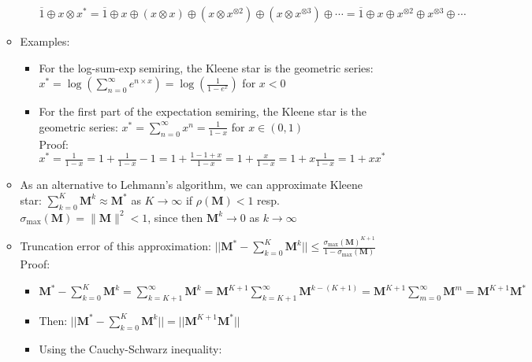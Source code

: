 \begin{itemize}
\begin{itemize}
\begin{itemize}
            $
            \overline{1} \oplus x \otimes x^* = \overline{1} \oplus x \oplus (x \otimes x) \oplus (x \otimes x^{\otimes 2}) \oplus (x \otimes x^{\otimes 3}) \oplus \cdots = \overline{1} \oplus x \oplus x^{\otimes 2} \oplus x^{\otimes 3} \oplus \cdots
            $
        \end{itemize}
        \item Examples:
        \begin{itemize}
            \item For the log-sum-exp semiring, the Kleene star is the geometric series:
            $
            x^* = \log(\sum_{n=0}^\infty e^{n\times x}) = \log (\frac{1}{1 - e^x})$ for $x < 0$
            \item For the first part of the expectation semiring, the Kleene star is the geometric series:
            $
            x^* = \sum_{n=0}^\infty x^n = \frac{1}{1 - x}$ for $x \in (0, 1)$\\
            Proof:
            $
            x^* = \frac{1}{1 - x} = 1 + \frac{1}{1 - x} -1 = 1 + \frac{1 - 1 + x}{1 - x} = 1 + \frac{x}{1 - x} = 1 + x \frac{1}{1 - x} = 1 + x x^*
            $
        \end{itemize}
        \item As an alternative to Lehmann's algorithm, we can approximate Kleene star:
        $
        \sum_{k=0}^{K} \boldsymbol{M}^k \approx \boldsymbol{M}^*$ as $K \to \infty$ if $\rho(\boldsymbol{M}) < 1$ resp. $\sigma_{\max}(\boldsymbol{M}) = \| \boldsymbol{M} \|^2 < 1
        $, since then $\boldsymbol{M}^k \to 0$ as $k \to \infty$
        \item Truncation error of this approximation:
        $
        || \boldsymbol{M}^* - \sum_{k=0}^K \boldsymbol{M}^k || \leq \frac{\sigma_{\max}(\boldsymbol{M})^{K+1}}{1 - \sigma_{\max}(\boldsymbol{M})}
        $\\
        Proof:
        \begin{itemize}
            \item $\boldsymbol{M}^* - \sum_{k=0}^K \boldsymbol{M}^k = \sum_{k=K+1}^\infty \boldsymbol{M}^k = \boldsymbol{M}^{K+1} \sum_{k=K+1}^\infty \boldsymbol{M}^{k-(K+1)} = \boldsymbol{M}^{K+1} \sum_{m=0}^\infty \boldsymbol{M}^m = \boldsymbol{M}^{K+1} \boldsymbol{M}^*$
            \item Then:
            $
            || \boldsymbol{M}^* - \sum_{k=0}^K \boldsymbol{M}^k || = || \boldsymbol{M}^{K+1} \boldsymbol{M}^* ||
            $
            \item Using the Cauchy-Schwarz inequality:

\end{itemize}
\end{itemize}
\end{itemize}
